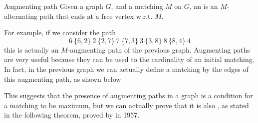 \documentclass[a4paper, 12pt]{report}
\begin{document}
    \begin{frameddefn}{Augmenting path}
        Given a graph $G$, and a matching $M$ on $G$, an  is an $M$-alternating path that ends at a free vertex w.r.t. $M$.
    \end{frameddefn}

    For example, if we consider the path $$6 \ \{6, 2\} \ 2 \ \{2, 7\} \ 7 \ \{7, 3\} \ 3 \ \{3, 8\} \ 8 \ \{8, 4 \} \ 4$$ this is actually an $M$-augmenting path of the previous graph. Augmenting paths are very useful because they can be used to  the cardinality of an initial matching. In fact, in the previous graph we can actually define a  matching by  the edges of this augmenting path, as shown below

    \begin{figure}[H]
        \centering
    \end{figure}

    This suggests that the presence of augmenting paths in a graph is a  condition for a matching  to be maximum, but we can actually prove that it is also , as stated in the following theorem, proved by \textcite{berge} in 1957.
\end{document}
